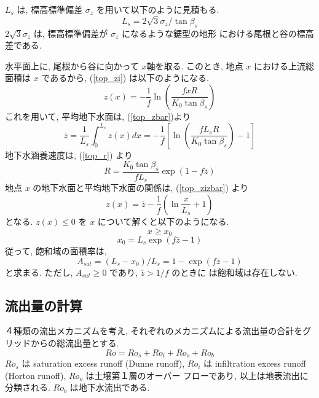 $L_s$ は, 標高標準偏差 $\sigma_z$ を用いて以下のように見積もる.
\begin{equation}
 L_s = 2\sqrt{3} \sigma_z / \tan\beta_s
\end{equation}
$2\sqrt{3}\sigma_z$ は, 標高標準偏差が $\sigma_z$ になるような鋸型の地形
における尾根と谷の標高差である.

水平面上に, 尾根から谷に向かって $x$軸を取る.
このとき, 地点 $x$ における上流総面積は $x$ であるから, (\ref{top_zi})
は以下のようになる.
\begin{equation}
 z(x) = - \frac{1}{f} \ln \left( \frac{fxR}{K_0 \tan \beta_s}\right)
\end{equation}
これを用いて, 平均地下水面は, (\ref{top_zbar})より
\begin{equation}
 \overline{z} = \frac 1{L_s}\int_0^{L_s} z(x) dx
 = - \frac1{f}\left[
 \ln \left( \frac{f L_s R}{K_0 \tan\beta_s}\right) -1
\right]
\end{equation}
地下水涵養速度は, (\ref{top_r}) より
\begin{equation}
 R = \frac{K_0 \tan\beta_s}{f L_s}\exp(1-f \overline{z})
\label{top_rb}
\end{equation}
地点 $x$ の地下水面と平均地下水面の関係は, (\ref{top_zizbar}) より
\begin{equation}
 z(x) = \overline{z} - \frac{1}{f}\left(
\ln \frac{x}{L_s} + 1
\right)
\end{equation}
となる.
$z(x) \leq 0$ を $x$ について解くと以下のようになる.
\begin{equation}
 x \geq x_0
\end{equation}
\begin{equation}
x_0 = L_s \exp(f\overline{z}-1)
 \end{equation}
従って, 飽和域の面積率は,
\begin{equation}
 A_{sat} = (L_s - x_0)/ L_s = 1 - \exp(f\overline{z}-1)
\label{top_asat}
\end{equation}
と求まる. ただし, $A_{sat} \geq 0$ であり, $\overline{z} > 1/f$ のときに
は飽和域は存在しない.

\subsection{流出量の計算}

４種類の流出メカニズムを考え, それぞれのメカニズムによる流出量の合計をグ
リッドからの総流出量とする.
\begin{equation}
 Ro = Ro_s + Ro_i + Ro_o + Ro_b
\end{equation}
$Ro_s$ は saturation excess runoff (Dunne runoff), $Ro_i$ は
infiltration excess runoff (Horton runoff), $Ro_o$ は土壌第１層のオーバー
フローであり, 以上は地表流出に分類される. $Ro_b$ は地下水流出である.

